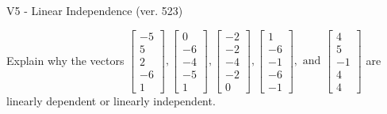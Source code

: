\begin{exercise}
  \begin{exerciseTitle}V5 - Linear Independence (ver. 523)\end{exerciseTitle}
  \begin{exerciseStatement}
    Explain why the vectors \(\left[\begin{array}{r}
-5 \\
5 \\
2 \\
-6 \\
1
\end{array}\right] , \left[\begin{array}{r}
0 \\
-6 \\
-4 \\
-5 \\
1
\end{array}\right] , \left[\begin{array}{r}
-2 \\
-2 \\
-4 \\
-2 \\
0
\end{array}\right] , \left[\begin{array}{r}
1 \\
-6 \\
-1 \\
-6 \\
-1
\end{array}\right] , \text{ and } \left[\begin{array}{r}
4 \\
5 \\
-1 \\
4 \\
4
\end{array}\right]\) are linearly dependent or linearly independent.	



\end{exerciseStatement}
\end{exercise}
